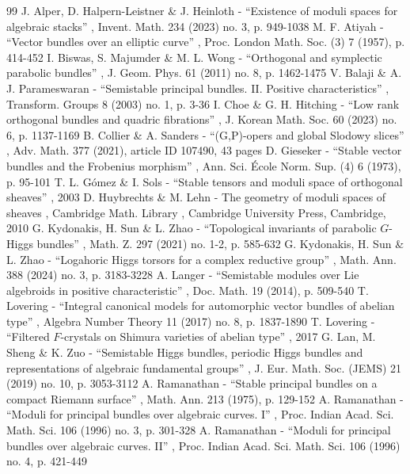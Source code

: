 \documentclass[11pt]{article}
\numberwithin{equation}{section}
\theoremstyle{plain}
\theoremstyle{definition}
\begin{document}
\begin{thebibliography}{99}
 J. Alper, D. Halpern-Leistner \& J. Heinloth - “Existence of moduli spaces for algebraic stacks” , Invent. Math. 234 (2023) no. 3, p. 949-1038
 M. F. Atiyah - “Vector bundles over an elliptic curve” , Proc. London Math. Soc. (3) 7 (1957), p. 414-452
 I. Biswas, S. Majumder \& M. L. Wong - “Orthogonal and symplectic parabolic bundles” , J. Geom. Phys. 61 (2011) no. 8, p. 1462-1475
 V. Balaji \& A. J. Parameswaran - “Semistable principal bundles. II. Positive characteristics” , Transform. Groups 8 (2003) no. 1, p. 3-36
 I. Choe \& G. H. Hitching - “Low rank orthogonal bundles and quadric fibrations” , J. Korean Math. Soc. 60 (2023) no. 6, p. 1137-1169
 B. Collier \& A. Sanders - “(G,P)-opers and global Slodowy slices” , Adv. Math. 377 (2021), article ID 107490, 43 pages
 D. Gieseker - “Stable vector bundles and the Frobenius morphism” , Ann. Sci. École Norm. Sup. (4) 6 (1973), p. 95-101
 T. L. Gómez \& I. Sols - “Stable tensors and moduli space of orthogonal sheaves” , 2003
 D. Huybrechts \& M. Lehn - The geometry of moduli spaces of sheaves , Cambridge Math. Library , Cambridge University Press, Cambridge, 2010
 G. Kydonakis, H. Sun \& L. Zhao - “Topological invariants of parabolic $G$-Higgs bundles” , Math. Z. 297 (2021) no. 1-2, p. 585-632
 G. Kydonakis, H. Sun \& L. Zhao - “Logahoric Higgs torsors for a complex reductive group” , Math. Ann. 388 (2024) no. 3, p. 3183-3228
 A. Langer - “Semistable modules over Lie algebroids in positive characteristic” , Doc. Math. 19 (2014), p. 509-540
 T. Lovering - “Integral canonical models for automorphic vector bundles of abelian type” , Algebra Number Theory 11 (2017) no. 8, p. 1837-1890
 T. Lovering - “Filtered $F$-crystals on Shimura varieties of abelian type” , 2017
 G. Lan, M. Sheng \& K. Zuo - “Semistable Higgs bundles, periodic Higgs bundles and representations of algebraic fundamental groups” , J. Eur. Math. Soc. (JEMS) 21 (2019) no. 10, p. 3053-3112
 A. Ramanathan - “Stable principal bundles on a compact Riemann surface” , Math. Ann. 213 (1975), p. 129-152
 A. Ramanathan - “Moduli for principal bundles over algebraic curves. I” , Proc. Indian Acad. Sci. Math. Sci. 106 (1996) no. 3, p. 301-328
 A. Ramanathan - “Moduli for principal bundles over algebraic curves. II” , Proc. Indian Acad. Sci. Math. Sci. 106 (1996) no. 4, p. 421-449

\end{thebibliography}
\end{document}
